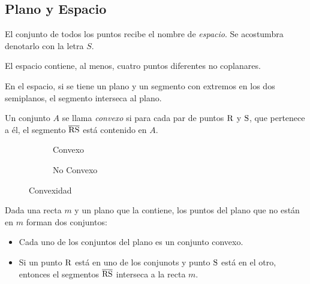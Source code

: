\clearpage

\subsection{Plano y Espacio}

\begin{definition}
El conjunto de todos los puntos recibe el nombre de \textit{espacio}. Se acostumbra denotarlo con la letra $S$.
\end{definition}

\begin{postulate}
El espacio contiene, al menos, cuatro puntos diferentes no coplanares.
\end{postulate}

\begin{postulate}
    En el espacio, si se tiene un plano y un segmento con extremos en los dos semiplanos, el segmento interseca al plano.
\end{postulate}

\begin{definition}
    Un conjunto $A$ se llama \textit{convexo} si para cada par de puntos $\rm R$ y $\rm S$, que pertenece a él, el segmento $\overline{\rm RS}$ está contenido en $A$.

    \begin{figure}[h!]

        \centering

        \begin{subfigure}[b]{.5\textwidth}
            \centering
            
            \label{fig:convexset}
            \caption{Convexo}            
        \end{subfigure}%
        \begin{subfigure}[b]{.5\textwidth}
            \centering
            
            \label{fig:notconvexset}
            \caption{No Convexo}            
        \end{subfigure}
        
        \centering
        \caption{Convexidad}
        \label{fig:convexidad}
    
    \end{figure}
    
\end{definition}

\begin{postulate}
    Dada una recta $m$ y un plano que la contiene, los puntos del plano que no están en $m$ forman dos conjuntos:

    \begin{itemize}
        \item Cada uno de los conjuntos del plano es un conjunto convexo.
        \item Si un punto $\rm R$ está en uno de los conjunots y punto $\rm S$ está en el otro, entonces el segmentos $\overline{\rm RS}$ interseca a la recta $m$.
    \end{itemize}
\end{postulate}

